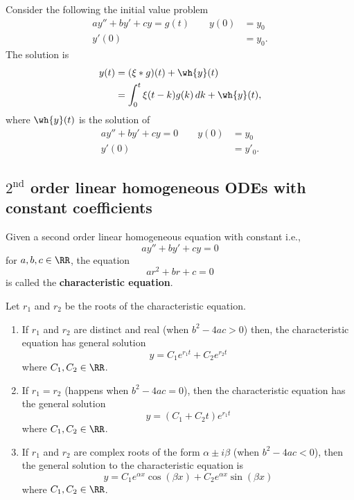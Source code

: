 \documentclass[12pt, a4paper]{article}
\begin{document}
\begin{mdcor}
    Consider the following the initial value problem 
    \[\begin{aligned}
        ay''+by'+cy =g(t) \qquad y(0) &=y_0 \\
        y'(0)&=y_0.
    \end{aligned}\]
    The solution is 
    \[\begin{aligned}
        y(t) &= (\xi * g)(t)+\wh{y}(t) \\
        &= \int_{0}^t \xi(t-k)g(k) \, dk + \wh{y}(t),
    \end{aligned}\]
    where \(\wh{y}(t)\) is the solution of 
    \[\begin{aligned}
        ay''+by'+cy = 0 \qquad y(0)&= y_0 \\
         y'(0)&= y'_0.
    \end{aligned}\]
\end{mdcor}

\subsection{\texorpdfstring{\(2^{\text{nd}}\)}{TEXT} order linear homogeneous ODEs with constant coefficients}

\begin{definition}
    Given a second order linear homogeneous equation with constant i.e.,
    \[ay''+by'+cy=0\]
    for \(a,b,c \in \RR\), the equation 
    \[ar^2+br+c = 0\]
    is called the \textbf{characteristic equation}.
\end{definition}

\begin{mdthm}
    Let \(r_1\) and \(r_2\) be the roots of the characteristic equation.
    \begin{enumerate}
        \item If \(r_1\) and \(r_2\) are distinct and real (when \(b^2-4ac>0\)) then, the characteristic equation has general solution 
        \[y= C_1e^{r_1 t}+C_2 e^{r_2 t}\]
        where \(C_1,C_2 \in \RR\).
        \item If \(r_1 = r_2\) (happens when \(b^2 -4ac=0\)), then the characteristic equation has the general solution 
        \[y=(C_1+C_2 t)e^{r_1 t}\]
        where \(C_1,C_2 \in \RR\).
        \item If \(r_1\) and \(r_2\) are complex roots of the form \(\alpha\pm i\beta\) (when \(b^2-4ac<0\)), then the general solution to the characteristic equation is 
        \[y = C_1 e^{\alpha x} \cos(\beta x)+C_2 e^{\alpha x} \sin(\beta x)\]
        where \(C_1,C_2 \in \RR\).
    \end{enumerate}
\end{mdthm}
\end{document}
